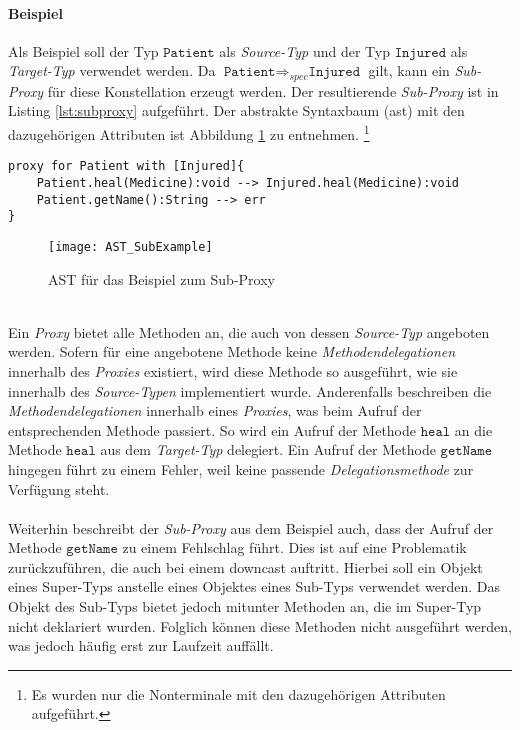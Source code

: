 \paragraph{Beispiel}
Als Beispiel soll  der Typ $\texttt{Patient}$ als \emph{Source-Typ} und der Typ $\texttt{Injured}$ als \emph{Target-Typ} verwendet werden. Da $\texttt{Patient} \Rightarrow_{spec} \texttt{Injured}$ gilt, kann ein \emph{Sub-Proxy} für diese Konstellation erzeugt werden. Der resultierende \emph{Sub-Proxy} ist in Listing \ref{lst:subproxy} aufgeführt. Der abstrakte Syntaxbaum (\acrshort{ast}) mit den dazugehörigen Attributen ist Abbildung \ref{fig:ASTSUB} zu entnehmen. \footnote{Es wurden nur die Nonterminale mit den dazugehörigen Attributen aufgeführt.}
\begin{lstlisting}[style = dsl, caption = Sub-Proxy für Patient, captionpos = b, label = lst:subproxy]
proxy for Patient with [Injured]{
	Patient.heal(Medicine):void --> Injured.heal(Medicine):void
	Patient.getName():String --> err
}
\end{lstlisting}
\noindent
\begin{figure}[h!]
\texttt{[image: AST\_SubExample]}
\caption{AST für das Beispiel zum Sub-Proxy}
\label{fig:ASTSUB}
\end{figure}
\noindent
\\
Ein \emph{Proxy} bietet alle Methoden an, die auch von dessen \emph{Source-Typ} angeboten werden. Sofern für eine angebotene Methode keine \emph{Methodendelegationen} innerhalb des \emph{Proxies} existiert, wird diese Methode so ausgeführt, wie sie innerhalb des \emph{Source-Typen} implementiert wurde. Anderenfalls beschreiben die \emph{Methodendelegationen} innerhalb eines \emph{Proxies}, was beim Aufruf der entsprechenden Methode passiert. So wird ein Aufruf der Methode $\texttt{heal}$ an die Methode $\texttt{heal}$ aus dem \emph{Target-Typ} delegiert. Ein Aufruf der Methode $\texttt{getName}$ hingegen führt zu einem Fehler, weil keine passende \emph{Delegationsmethode} zur Verfügung steht.
\\\\
Weiterhin beschreibt der \emph{Sub-Proxy} aus dem Beispiel auch, dass der Aufruf der Methode $\texttt{getName}$ zu einem Fehlschlag führt. Dies ist auf eine Problematik zurückzuführen, die auch bei einem \Gls{downcast} auftritt. Hierbei soll ein Objekt eines Super-Typs anstelle eines Objektes eines Sub-Typs verwendet werden. Das Objekt des Sub-Typs bietet jedoch mitunter Methoden an, die im Super-Typ nicht deklariert wurden. Folglich können diese Methoden nicht ausgeführt werden, was jedoch häufig erst zur Laufzeit auffällt. 
